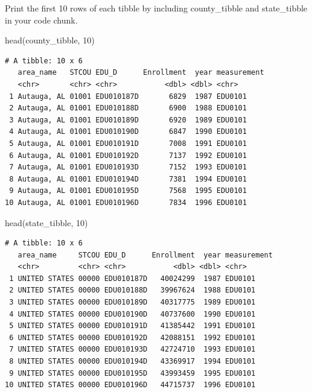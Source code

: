 \documentclass[
  letterpaper,
  DIV=11,
  numbers=noendperiod]{scrartcl}
\newenvironment{Shaded}{\begin{snugshade}}{\end{snugshade}}
\newcommand{\DecValTok}[1]{\textcolor[rgb]{0.68,0.00,0.00}{#1}}
\newcommand{\FunctionTok}[1]{\textcolor[rgb]{0.28,0.35,0.67}{#1}}
\newcommand{\NormalTok}[1]{\textcolor[rgb]{0.00,0.23,0.31}{#1}}
\begin{document}
Print the first 10 rows of each tibble by including county\_tibble and
state\_tibble in your code chunk.

\begin{Shaded}
\begin{Highlighting}[]
\FunctionTok{head}\NormalTok{(county\_tibble, }\DecValTok{10}\NormalTok{)}
\end{Highlighting}
\end{Shaded}

\begin{verbatim}
# A tibble: 10 x 6
   area_name   STCOU EDU_D      Enrollment  year measurement
   <chr>       <chr> <chr>           <dbl> <dbl> <chr>      
 1 Autauga, AL 01001 EDU010187D       6829  1987 EDU0101    
 2 Autauga, AL 01001 EDU010188D       6900  1988 EDU0101    
 3 Autauga, AL 01001 EDU010189D       6920  1989 EDU0101    
 4 Autauga, AL 01001 EDU010190D       6847  1990 EDU0101    
 5 Autauga, AL 01001 EDU010191D       7008  1991 EDU0101    
 6 Autauga, AL 01001 EDU010192D       7137  1992 EDU0101    
 7 Autauga, AL 01001 EDU010193D       7152  1993 EDU0101    
 8 Autauga, AL 01001 EDU010194D       7381  1994 EDU0101    
 9 Autauga, AL 01001 EDU010195D       7568  1995 EDU0101    
10 Autauga, AL 01001 EDU010196D       7834  1996 EDU0101    
\end{verbatim}

\begin{Shaded}
\begin{Highlighting}[]
\FunctionTok{head}\NormalTok{(state\_tibble, }\DecValTok{10}\NormalTok{)}
\end{Highlighting}
\end{Shaded}

\begin{verbatim}
# A tibble: 10 x 6
   area_name     STCOU EDU_D      Enrollment  year measurement
   <chr>         <chr> <chr>           <dbl> <dbl> <chr>      
 1 UNITED STATES 00000 EDU010187D   40024299  1987 EDU0101    
 2 UNITED STATES 00000 EDU010188D   39967624  1988 EDU0101    
 3 UNITED STATES 00000 EDU010189D   40317775  1989 EDU0101    
 4 UNITED STATES 00000 EDU010190D   40737600  1990 EDU0101    
 5 UNITED STATES 00000 EDU010191D   41385442  1991 EDU0101    
 6 UNITED STATES 00000 EDU010192D   42088151  1992 EDU0101    
 7 UNITED STATES 00000 EDU010193D   42724710  1993 EDU0101    
 8 UNITED STATES 00000 EDU010194D   43369917  1994 EDU0101    
 9 UNITED STATES 00000 EDU010195D   43993459  1995 EDU0101    
10 UNITED STATES 00000 EDU010196D   44715737  1996 EDU0101    
\end{verbatim}
\end{document}
